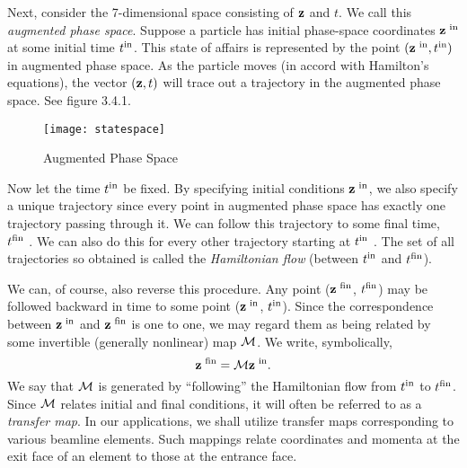      Next, consider the 7-dimensional space consisting of ${\bf z}$ and $t$.  We call this
{\em augmented phase space}.  Suppose a particle has initial phase-space
coordinates ${\bf z}^{\mbox{\scriptsize \ in}}$   at
some initial time $t^{\mbox{\scriptsize in}}$.  This state of affairs is represented by the point
$({\bf z}^{\mbox{\scriptsize \ in}},t^{\mbox{\scriptsize in}})$ in augmented phase space.  As the particle moves (in accord with Hamilton's
equations), the vector $({\bf z},t)$ will trace out a trajectory in the augmented phase space.
See figure 3.4.1.

\begin{figure}[h]
  \centering
  \texttt{[image: statespace]}
  \caption{Augmented Phase Space}
\end{figure}


     Now let the time $t^{\mbox{\scriptsize in}}$ be fixed.  By
specifying initial conditions ${\bf z}^{\mbox{\scriptsize \ in}}$,
we also specify a unique trajectory since every point in augmented phase space has
exactly one trajectory passing through it.  We can follow this trajectory
to some final time, $t^{\mbox{\scriptsize fin}}$   .  We can also do this for every other trajectory
starting at $t^{\mbox{\scriptsize in}}$  .  The set of all trajectories so obtained is called the {\em Hamiltonian flow} (between $t^{\mbox{\scriptsize in}}$   and $t^{\mbox{\scriptsize fin}}$).

     We can, of course, also reverse this procedure.  Any point (${\bf z}^{\mbox{\scriptsize \ fin}}$, $t^{\mbox{\scriptsize fin}}$)
may be followed backward in time to some point (${\bf z}^{\mbox{\scriptsize \ in}}$, $t^{\mbox{\scriptsize in}}$).  Since the
correspondence between ${\bf z}^{\mbox{\scriptsize\ in}}$ and ${\bf z}^{\mbox{\scriptsize \ fin}}$    is one to one, we may regard them as
being related by some invertible (generally nonlinear) map ${\cal M}$.  We write,
symbolically,
\begin{equation}
      {\bf z}^{\mbox{\scriptsize \ fin}}  = {\cal M} {\bf z}^{\mbox{\scriptsize
      \ in}}   .
\end{equation}
We say that ${\cal M}$ is generated by ``following'' the Hamiltonian flow from $t^{\mbox{\scriptsize in}}$   to $t^{\mbox{\scriptsize fin}}$.  Since ${\cal M}$ relates initial and final conditions, it will often be
referred to as a {\em transfer map}.  In our applications, we shall utilize
transfer maps corresponding to various beamline elements.  Such mappings
relate coordinates and momenta at the exit face of an element to those at
the entrance face.


